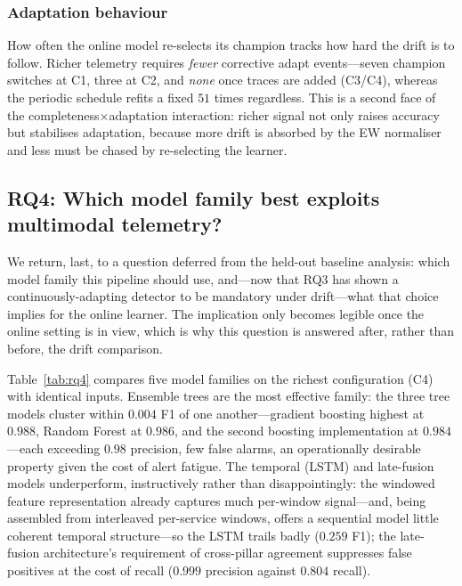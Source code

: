 \documentclass[pdflatex,sn-mathphys-num]{sn-jnl}%
\theoremstyle{thmstyleone}%
\theoremstyle{thmstyletwo}%
\theoremstyle{thmstylethree}%
\begin{document}
\subsubsection{Adaptation behaviour}\label{sec:res-rq3-adapt}

How often the online model re-selects its champion tracks how hard the drift is to follow. Richer telemetry requires \emph{fewer} corrective adapt events---seven champion switches at C1, three at C2, and \emph{none} once traces are added (C3/C4), whereas the periodic schedule refits a fixed $51$ times regardless. This is a second face of the completeness$\times$adaptation interaction: richer signal not only raises accuracy but stabilises adaptation, because more drift is absorbed by the EW normaliser and less must be chased by re-selecting the learner.

\subsection{RQ4: Which model family best exploits multimodal telemetry?}\label{sec:res-rq4}

We return, last, to a question deferred from the held-out baseline analysis: which model family this pipeline should use, and---now that RQ3 has shown a continuously-adapting detector to be mandatory under drift---what that choice implies for the online learner. The implication only becomes legible once the online setting is in view, which is why this question is answered after, rather than before, the drift comparison.

Table~\ref{tab:rq4} compares five model families on the richest configuration (C4) with identical inputs. Ensemble trees are the most effective family: the three tree models cluster within $0.004$ F1 of one another---gradient boosting highest at $0.988$, Random Forest at $0.986$, and the second boosting implementation at $0.984$---each exceeding $0.98$ precision, few false alarms, an operationally desirable property given the cost of alert fatigue. The temporal (LSTM) and late-fusion models underperform, instructively rather than disappointingly: the windowed feature representation already captures much per-window signal---and, being assembled from interleaved per-service windows, offers a sequential model little coherent temporal structure---so the LSTM trails badly ($0.259$ F1); the late-fusion architecture's requirement of cross-pillar agreement suppresses false positives at the cost of recall ($0.999$ precision against $0.804$ recall).
\end{document}
